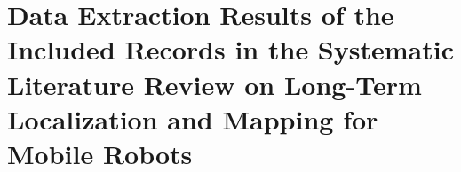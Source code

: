 \section{Data Extraction Results of the Included Records in the Systematic Literature Review on Long-Term Localization and Mapping for Mobile Robots}
\label{a2:data-extraction}


